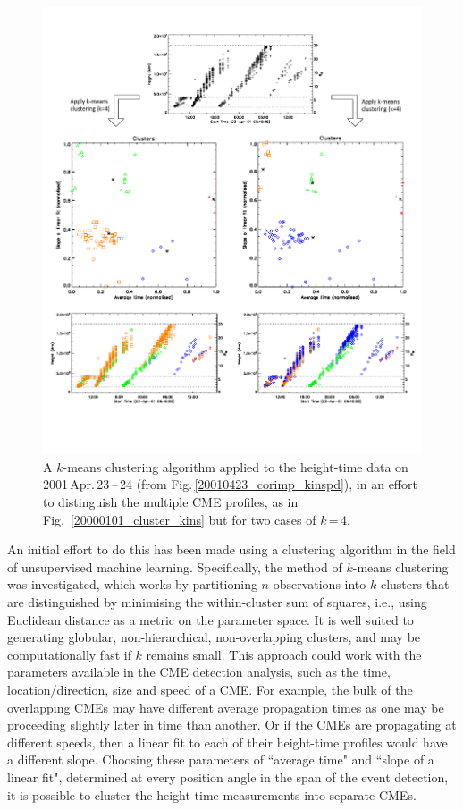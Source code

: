 \documentclass[referee,a4paper,12pt,traditabstract]{swsc}
\begin{document}
\begin{figure}[t]
\centerline{\includegraphics[scale=0.578, trim=0 95 0 50, clip=true]{20010423_cluster_kins_input.pdf}}
\caption{A $k$-means clustering algorithm applied to the height-time data on 2001\,Apr.\,23\,--\,24 (from Fig.\,\ref{20010423_corimp_kinspd}), in an effort to distinguish the multiple CME profiles, as in Fig.~\ref{20000101_cluster_kins} but for two cases of $k$\,=\,4.
}
\label{20010423_cluster_kins}
\end{figure}


An initial effort to do this has been made using a clustering algorithm in the field of unsupervised machine learning. Specifically, the method of $k$-means clustering was investigated, which works by partitioning $n$ observations into $k$ clusters that are distinguished by minimising the within-cluster sum of squares, i.e., using Euclidean distance as a metric on the parameter space. It is well suited to generating globular, non-hierarchical, non-overlapping clusters, and may be computationally fast if $k$ remains small. This approach could work with the parameters available in the CME detection analysis, such as the time, location/direction, size and speed of a CME. For example, the bulk of the overlapping CMEs may have different average propagation times as one may be proceeding slightly later in time than another. Or if the CMEs are propagating at different speeds, then a linear fit to each of their height-time profiles would have a different slope. Choosing these parameters of ``average time" and ``slope of a linear fit", determined at every position angle in the span of the event detection, it is possible to cluster the height-time measurements into separate CMEs.
\end{document}
